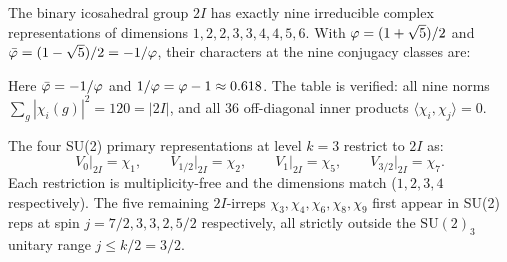 \begin{theorem}
\label{P5:thm:2I_characters}
The binary icosahedral group $2I$ has exactly nine irreducible complex
representations of dimensions $1,2,2,3,3,4,4,5,6$.
With $\varphi=(1+\sqrt{5})/2$ and $\bar{\varphi}=(1-\sqrt{5})/2 = -1/\varphi$,
their characters at the nine conjugacy classes are:

\begin{center}
\renewcommand{\arraystretch}{1.35}
\end{center}
\noindent
Here $\bar{\varphi} = -1/\varphi$ and $1/\varphi = \varphi - 1 \approx 0.618$.
The table is verified:
all nine norms $\sum_g |\chi_i(g)|^2 = 120 = |2I|$,
and all 36 off-diagonal inner products $\langle\chi_i,\chi_j\rangle = 0$.
\end{theorem}

\begin{proposition}[SU(2) restriction to $2I$]
\label{P5:prop:su2_branching}
The four SU(2) primary representations at level $k=3$ restrict to $2I$ as:
\begin{equation}
  V_0\big|_{2I} = \chi_1, \qquad
  V_{1/2}\big|_{2I} = \chi_2, \qquad
  V_1\big|_{2I} = \chi_5, \qquad
  V_{3/2}\big|_{2I} = \chi_7.
  \label{P5:eq:su2_branching}
\end{equation}
Each restriction is multiplicity-free and the dimensions match
($1,2,3,4$ respectively). The five remaining $2I$-irreps
$\chi_3,\chi_4,\chi_6,\chi_8,\chi_9$ first appear in SU(2) reps at spin
$j=7/2,3,3,2,5/2$ respectively, all strictly outside the
$\mathrm{SU}(2)_3$ unitary range $j\le k/2=3/2$.
\end{proposition}

